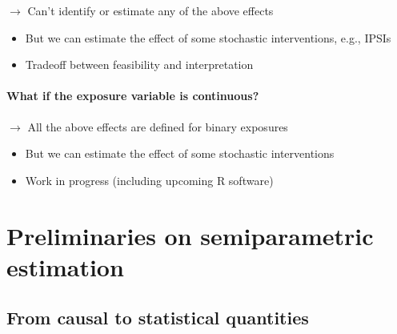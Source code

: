 \documentclass[
  12pt,
]{book}
\providecommand{\tightlist}{%
  \setlength{\itemsep}{0pt}\setlength{\parskip}{0pt}}
\theoremstyle{definition}
\theoremstyle{definition}
\theoremstyle{definition}
\newcommand{\1}{\mathbbm{1}}
\begin{document}
\(\rightarrow\) Can't identify or estimate any of the above effects

\begin{itemize}
\tightlist
\item
  But we can estimate the effect of some stochastic interventions, e.g., IPSIs
\item
  Tradeoff between feasibility and interpretation
\end{itemize}

\hypertarget{what-if-the-exposure-variable-is-continuous}{%
\subsubsection*{What if the exposure variable is continuous?}\label{what-if-the-exposure-variable-is-continuous}}


\(\rightarrow\) All the above effects are defined for binary exposures

\begin{itemize}
\tightlist
\item
  But we can estimate the effect of some stochastic interventions
\item
  Work in progress (including upcoming R software)
\end{itemize}

\hypertarget{preliminaries-on-semiparametric-estimation}{%
\chapter{Preliminaries on semiparametric estimation}\label{preliminaries-on-semiparametric-estimation}}

\hypertarget{from-causal-to-statistical-quantities}{%
\section{From causal to statistical quantities}\label{from-causal-to-statistical-quantities}}
\end{document}

